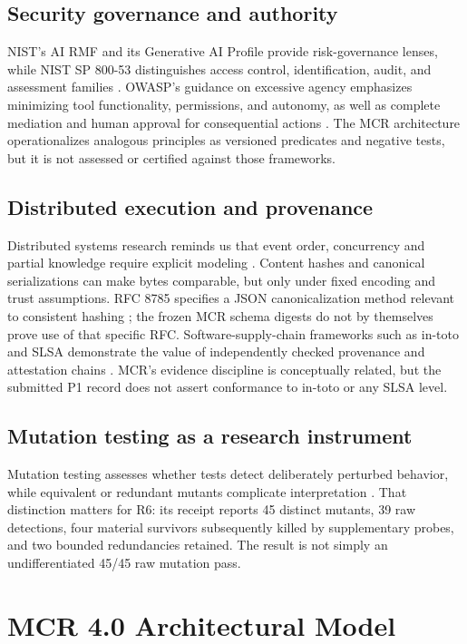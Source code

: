 \documentclass[11pt,twocolumn]{article}
\begin{document}
\subsection{Security governance and authority}
NIST's AI RMF and its Generative AI Profile provide risk-governance lenses, while NIST SP 800-53 distinguishes access control, identification, audit, and assessment families \cite{nistAirmf,nistGai,nist80053}. OWASP's guidance on excessive agency emphasizes minimizing tool functionality, permissions, and autonomy, as well as complete mediation and human approval for consequential actions \cite{owaspAgency}. The MCR architecture operationalizes analogous principles as versioned predicates and negative tests, but it is not assessed or certified against those frameworks.

\subsection{Distributed execution and provenance}
Distributed systems research reminds us that event order, concurrency and partial knowledge require explicit modeling \cite{lamport1978}. Content hashes and canonical serializations can make bytes comparable, but only under fixed encoding and trust assumptions. RFC 8785 specifies a JSON canonicalization method relevant to consistent hashing \cite{rfc8785}; the frozen MCR schema digests do not by themselves prove use of that specific RFC. Software-supply-chain frameworks such as in-toto and SLSA demonstrate the value of independently checked provenance and attestation chains \cite{intoto2019,slsa11}. MCR's evidence discipline is conceptually related, but the submitted P1 record does not assert conformance to in-toto or any SLSA level.

\subsection{Mutation testing as a research instrument}
Mutation testing assesses whether tests detect deliberately perturbed behavior, while equivalent or redundant mutants complicate interpretation \cite{jia2011}. That distinction matters for R6: its receipt reports 45 distinct mutants, 39 raw detections, four material survivors subsequently killed by supplementary probes, and two bounded redundancies retained. The result is not simply an undifferentiated 45/45 raw mutation pass.

\section{MCR 4.0 Architectural Model}
\end{document}

